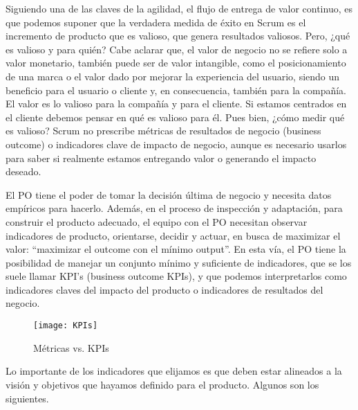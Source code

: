 Siguiendo una de las claves de la agilidad, el flujo de entrega de valor continuo, es que podemos suponer que la verdadera medida de éxito en Scrum es el incremento de producto que es valioso, que genera resultados valiosos. Pero, ¿qué es valioso y para quién? Cabe aclarar que, el valor de negocio no se refiere solo a valor monetario, también puede ser de valor intangible, como el posicionamiento de una marca o el valor dado por mejorar la experiencia del usuario, siendo un beneficio para el usuario o cliente y, en consecuencia, también para la compañía. El valor es lo valioso para la compañía y para el cliente. Si estamos centrados en el cliente debemos pensar en qué es valioso para él. Pues bien, ¿cómo medir qué es valioso?
Scrum no prescribe métricas de resultados de negocio (business outcome) o indicadores clave de impacto de negocio, aunque es necesario usarlos para saber si realmente estamos entregando valor o generando el impacto deseado. 

El PO tiene el poder de tomar la decisión última de negocio y necesita datos empíricos para hacerlo. Además, en el proceso de inspección y adaptación, para construir el producto adecuado, el equipo con el PO necesitan observar indicadores de producto, orientarse, decidir y actuar, en busca de maximizar el valor: “maximizar el outcome con el mínimo output”. En esta vía, el PO tiene la posibilidad de manejar un conjunto mínimo y suficiente de indicadores, que se los suele llamar KPI's (business outcome KPIs), y que podemos interpretarlos como indicadores claves del impacto del producto o indicadores de resultados del negocio.

\begin{figure}[h]
  \centering
  \texttt{[image: KPIs]}
  \caption{Métricas vs. KPIs}
  \centering
  \label{fig:KPIs} %
\end{figure}
\FloatBarrier %

Lo importante de los indicadores que elijamos es que deben estar alineados a la visión y objetivos que hayamos definido para el producto.
Algunos son los siguientes.



